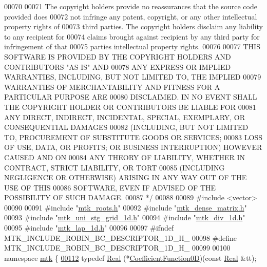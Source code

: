\begin{DoxyCode}
00070 \textcolor{comment}{}
00071 \textcolor{comment}{The copyright holders provide no reassurances that the source code provided does}
00072 \textcolor{comment}{not infringe any patent, copyright, or any other intellectual property rights of}
00073 \textcolor{comment}{third parties. The copyright holders disclaim any liability to any recipient for}
00074 \textcolor{comment}{claims brought against recipient by any third party for infringement of that}
00075 \textcolor{comment}{parties intellectual property rights.}
00076 \textcolor{comment}{}
00077 \textcolor{comment}{THIS SOFTWARE IS PROVIDED BY THE COPYRIGHT HOLDERS AND CONTRIBUTORS "AS IS" AND}
00078 \textcolor{comment}{ANY EXPRESS OR IMPLIED WARRANTIES, INCLUDING, BUT NOT LIMITED TO, THE IMPLIED}
00079 \textcolor{comment}{WARRANTIES OF MERCHANTABILITY AND FITNESS FOR A PARTICULAR PURPOSE ARE}
00080 \textcolor{comment}{DISCLAIMED. IN NO EVENT SHALL THE COPYRIGHT HOLDER OR CONTRIBUTORS BE LIABLE FOR}
00081 \textcolor{comment}{ANY DIRECT, INDIRECT, INCIDENTAL, SPECIAL, EXEMPLARY, OR CONSEQUENTIAL DAMAGES}
00082 \textcolor{comment}{(INCLUDING, BUT NOT LIMITED TO, PROCUREMENT OF SUBSTITUTE GOODS OR SERVICES;}
00083 \textcolor{comment}{LOSS OF USE, DATA, OR PROFITS; OR BUSINESS INTERRUPTION) HOWEVER CAUSED AND ON}
00084 \textcolor{comment}{ANY THEORY OF LIABILITY, WHETHER IN CONTRACT, STRICT LIABILITY, OR TORT}
00085 \textcolor{comment}{(INCLUDING NEGLIGENCE OR OTHERWISE) ARISING IN ANY WAY OUT OF THE USE OF THIS}
00086 \textcolor{comment}{SOFTWARE, EVEN IF ADVISED OF THE POSSIBILITY OF SUCH DAMAGE.}
00087 \textcolor{comment}{*/}
00088 
00089 \textcolor{preprocessor}{#include <vector>}
00090 
00091 \textcolor{preprocessor}{#include "\hyperlink{mtk__roots_8h}{mtk\_roots.h}"}
00092 \textcolor{preprocessor}{#include "\hyperlink{mtk__dense__matrix_8h}{mtk\_dense\_matrix.h}"}
00093 \textcolor{preprocessor}{#include "\hyperlink{mtk__uni__stg__grid__1d_8h}{mtk\_uni\_stg\_grid\_1d.h}"}
00094 \textcolor{preprocessor}{#include "\hyperlink{mtk__div__1d_8h}{mtk\_div\_1d.h}"}
00095 \textcolor{preprocessor}{#include "\hyperlink{mtk__lap__1d_8h}{mtk\_lap\_1d.h}"}
00096 
00097 \textcolor{preprocessor}{#ifndef MTK\_INCLUDE\_ROBIN\_BC\_DESCRIPTOR\_1D\_H\_}
00098 \textcolor{preprocessor}{#define MTK\_INCLUDE\_ROBIN\_BC\_DESCRIPTOR\_1D\_H\_}
00099 
00100 \textcolor{keyword}{namespace }\hyperlink{namespacemtk}{mtk} \{
\hypertarget{mtk__robin__bc__descriptor__1d_8h_source_l00112}{}\hyperlink{group__c07-mim__ops_ga04276745b4d511f0f3c636d6e0df7c2d}{00112} \textcolor{keyword}{typedef} \hyperlink{group__c01-roots_gac080bbbf5cbb5502c9f00405f894857d}{Real} (*\hyperlink{group__c07-mim__ops_ga04276745b4d511f0f3c636d6e0df7c2d}{CoefficientFunction0D})(\textcolor{keyword}{const} \hyperlink{group__c01-roots_gac080bbbf5cbb5502c9f00405f894857d}{Real} &tt);

\end{DoxyCode}

